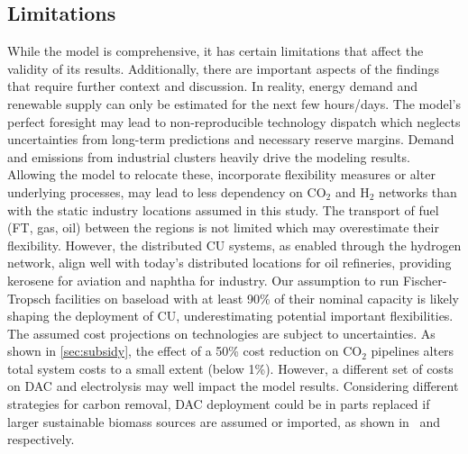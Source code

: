 \documentclass[twocolumn]{article}
\newcommand{\carbon}{CO$_2$}
\newcommand{\hydrogen}{H$_2$}
\begin{document}
\subsection{Limitations}
\label{sec:limitations}
While the model is comprehensive, it has certain limitations that affect the validity of its results. Additionally, there are important aspects of the findings that require further context and discussion.
In reality, energy demand and renewable supply can only be estimated for the next few hours/days. The model's perfect foresight may lead to non-reproducible technology dispatch which neglects uncertainties from long-term predictions and necessary reserve margins.
Demand and emissions from industrial clusters heavily drive the modeling results. Allowing the model to relocate these, incorporate flexibility measures or alter underlying processes, may lead to less dependency on \carbon{} and \hydrogen{} networks than with the static industry locations assumed in this study.
The transport of fuel (FT, gas, oil) between the regions is not limited which may overestimate their flexibility. However, the distributed CU systems, as enabled through the hydrogen network, align well with today's distributed locations for oil refineries, providing kerosene for aviation and naphtha for industry. Our assumption to run Fischer-Tropsch facilities on baseload with at least 90\% of their nominal capacity is likely shaping the deployment of CU, underestimating potential important flexibilities.
The assumed cost projections on technologies are subject to uncertainties. As shown in \ref{sec:subsidy}, the effect of a 50\% cost reduction on \carbon{} pipelines alters total system costs to a small extent (below 1\%). However, a different set of costs on DAC and electrolysis may well impact the model results.
Considering different strategies for carbon removal, DAC deployment could be in parts replaced if larger sustainable biomass sources are assumed or imported, as shown in~\cite{lauerCrucialRoleBioenergy2023} and~\cite{millingerDiversityBiomassUsage2023} respectively.
\end{document}
